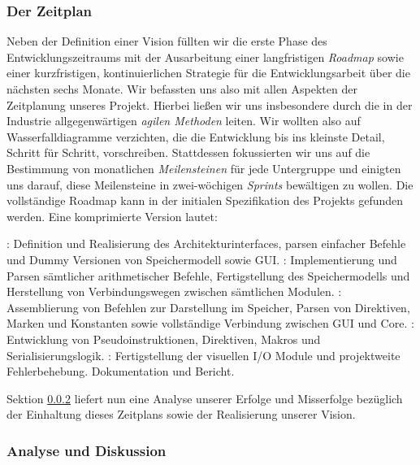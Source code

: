 \subsubsection{Der Zeitplan}
\label{team:orga-plan-time}

Neben der Definition einer Vision füllten wir die erste Phase des
Entwicklungszeitraums mit der Ausarbeitung einer langfristigen \emph{Roadmap}
sowie einer kurzfristigen, kontinuierlichen Strategie für die Entwicklungsarbeit
über die nächsten sechs Monate. Wir befassten uns also mit allen Aspekten der
Zeitplanung unseres Projekt. Hierbei ließen wir uns insbesondere durch die in
der Industrie allgegenwärtigen \emph{agilen Methoden} leiten. Wir wollten also
auf Wasserfalldiagramme verzichten, die die Entwicklung bis ins kleinste Detail,
Schritt für Schritt, vorschreiben. Stattdessen fokussierten wir uns auf die
Bestimmung von monatlichen \emph{Meilensteinen} für jede Untergruppe und
einigten uns darauf, diese Meilensteine in zwei-wöchigen \emph{Sprints}
bewältigen zu wollen. Die vollständige Roadmap kann in der initialen
Spezifikation des Projekts gefunden werden. Eine komprimierte Version lautet:

\begin{itemize}
  : Definition und Realisierung des Architekturinterfaces, parsen einfacher Befehle und Dummy Versionen von Speichermodell sowie GUI.
  : Implementierung und Parsen sämtlicher arithmetischer Befehle, Fertigstellung des Speichermodells und Herstellung von Verbindungswegen zwischen sämtlichen Modulen.
  : Assemblierung von Befehlen zur Darstellung im Speicher, Parsen von Direktiven, Marken und Konstanten sowie vollständige Verbindung zwischen GUI und Core.
  : Entwicklung von Pseudoinstruktionen, Direktiven, Makros und Serialisierungslogik.
  : Fertigstellung der visuellen I/O Module und projektweite Fehlerbehebung.
   Dokumentation und Bericht.
\end{itemize}

Sektion \ref{team:orga-plan-anal} liefert nun eine Analyse unserer Erfolge und Misserfolge bezüglich der Einhaltung dieses Zeitplans sowie der Realisierung unserer Vision.

\subsubsection{Analyse und Diskussion}
\label{team:orga-plan-anal}

